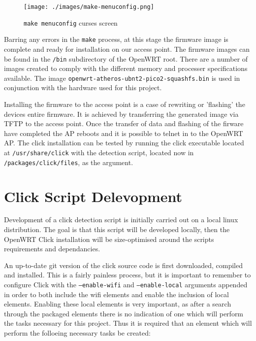 \begin{figure}[h]
 \centering
 \texttt{[image: ./images/make-menuconfig.png]}
  \caption{\texttt{make menuconfig} curses screen} 
  \label{fig:menuconfig} 
\end{figure}

Barring any errors in the \texttt{make} process, at this stage the firmware image is complete and ready for installation on our access point. The firmware images can be found in the \texttt{/bin} subdirectory of the OpenWRT root. There are a number of images created to comply with the different memory and processer specifications available. The image \texttt{openwrt-atheros-ubnt2-pico2-squashfs.bin} is used in conjunction with the hardware used for this project.

Installing the firmware to the access point is a case of rewriting or 'flashing' the devices entire firmware. It is achieved by transferring the generated image via TFTP to the access point. Once the transfer of data and flashing of the firware have completed the AP reboots and it is possible to telnet in to the OpenWRT AP. The click installation can be tested by running the click executable located at \texttt{/usr/share/click} with the detection script, located now in \texttt{/packages/click/files}, as the argument.

\section{Click Script Delevopment}

Development of a click detection script is initially carried out on a local linux distribution. The goal is that this script will be developed locally, then the OpenWRT Click installation will be size-optimised around the scripts requirements and dependancies.

An up-to-date git version of the click source code is first downloaded, compiled and installed. This is a fairly painless process, but it is important to remember to configure Click with the \texttt{--enable-wifi} and \texttt{--enable-local} arguments appended in order to both include the wifi elements and enable the inclusion of local elements. Enabling these local elements is very important, as after a search through the packaged elements there is no indication of one which will perform the tasks necessary for this project. Thus it is required that an element which will perform the folloeing necessary tasks be created:

